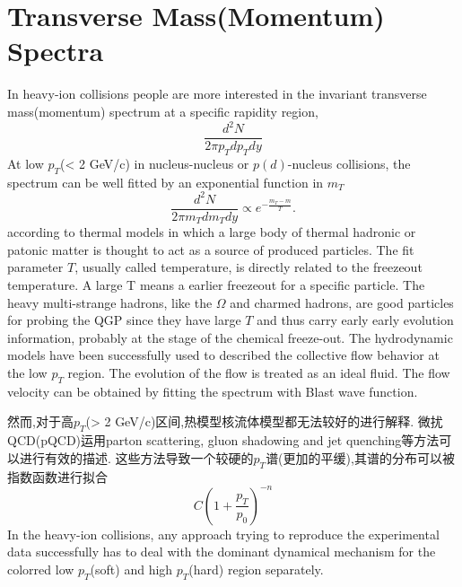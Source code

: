 \section{Transverse Mass(Momentum) Spectra}
In heavy-ion collisions people are more interested in the invariant transverse mass(momentum) spectrum at a specific rapidity region,
\begin{equation}
  \label{eq:S2}
  \frac{d^{2}N}{2\pi{}p_{T}dp_{T}dy}
\end{equation}
At low $p_{T}$(< 2 GeV/c) in nucleus-nucleus or $p(d)$-nucleus collisions,
the spectrum can be well fitted by an exponential function in $m_{T}$
\begin{equation}
  \label{eq:S3}
  \frac{d^{2}N}{2\pi{}m_{T}dm_{T}dy} \propto e^{-\frac{m_{T}-m}{T}}.
\end{equation}
according to thermal models in which a large body of thermal hadronic or patonic matter is thought to act as a source of produced particles.
The fit parameter $T$, usually called temperature, is directly related to the freezeout temperature.
A large T means a earlier freezeout for a specific particle.
The heavy multi-strange hadrons, like the $\Omega$ and charmed hadrons, are good particles for probing the QGP since they have large $T$ and thus carry early early evolution information,
probably at the stage of the chemical freeze-out.
The hydrodynamic models have been successfully used to described the collective flow behavior at the low $p_{T}$ region.
The evolution of the flow is treated as an ideal fluid.
The flow velocity can be obtained by fitting the spectrum with Blast wave function.

然而,对于高$p_{T}$(> 2 GeV/c)区间,热模型核流体模型都无法较好的进行解释.
微扰QCD(pQCD)运用parton scattering, gluon shadowing and jet quenching等方法可以进行有效的描述.
这些方法导致一个较硬的$p_{T}$谱(更加的平缓),其谱的分布可以被指数函数进行拟合
\begin{equation}
  \label{eq:1}
  C(1+\frac{p_{T}}{p_{0}})^{-n}
\end{equation}
In the heavy-ion collisions, any approach trying to reproduce the experimental data successfully has to deal with the dominant dynamical mechanism for the {color{red} low $p_{T}$(soft) and high $p_{T}$(hard) region separately.}

